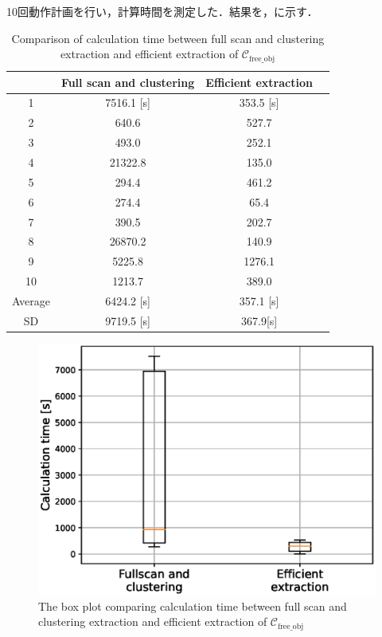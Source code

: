 \documentclass[a4paper,twoside,12pt,papersize, dvipdfmx]{iirthesis}
\begin{document}
10回動作計画を行い，計算時間を測定した．結果を，に示す．
\begin{table}[b]
    \centering
    \caption{Comparison of calculation time between full scan and clustering extraction and efficient extraction of $\mathcal{C}_{\mathrm{free\_obj}}$}
    \label{tab::planner::rasterdfs}
    \begin{tabular}{|c|c|c|c|}
    \hline
        ~ & Full scan and clustering & Efficient extraction  \\ \hline
        1 & 7516.1 [s] & 353.5 [s]  \\ \hline
        2 & 640.6 & 527.7  \\ \hline
        3 & 493.0 & 252.1    \\ \hline
        4 & 21322.8 & 135.0    \\ \hline
        5 & 294.4 & 461.2   \\ \hline
        6 & 274.4 & 65.4    \\ \hline
        7 & 390.5 & 202.7   \\ \hline
        8 & 26870.2 &140.9   \\ \hline
        9 & 5225.8 &1276.1  \\ \hline
        10 & 1213.7 &  389.0  \\ \hline
        Average & 6424.2 [s] & 357.1 [s]  \\ \hline
        SD & 9719.5 [s] &  367.9[s]  \\ \hline
    \end{tabular}
\end{table}
\begin{figure}[bt]
\centering
\includegraphics[width=0.5\hsize]{fig/3-new-planner/3_2_2.eps}
\caption{The box plot comparing calculation time between full scan and clustering extraction and efficient extraction of $\mathcal{C}_{\mathrm{free\_obj}}$}
\label{fig::planner::rasterdfs}
\end{figure}
\end{document}
